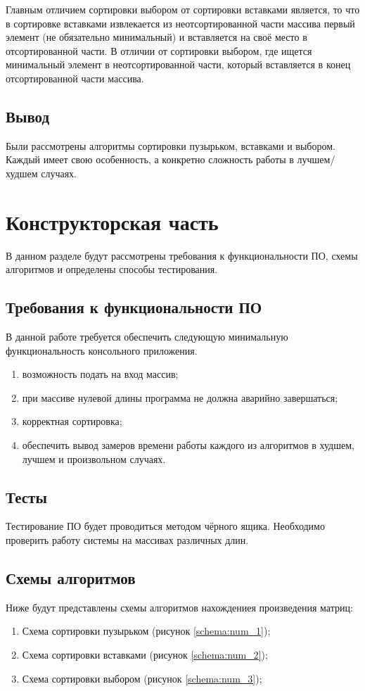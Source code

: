 \documentclass[utf8x, 12pt]{G7-32}
\begin{document}
            Главным отличием сортировки выбором от сортировки вставками является, то что в сортировке вставками 
            извлекается из неотсортированной части массива первый элемент (не обязательно минимальный) и
            вставляется на своё место в отсортированной части.
            В отличии от сортировки выбором, где ищется минимальный элемент 
            в неотсортированной части,  который вставляется в конец отсортированной части массива.

\section{Вывод}
Были рассмотрены алгоритмы сортировки пузырьком, вставками и выбором. Каждый имеет свою особенность, а конкретно сложность работы в лучшем/худшем случаях.




\chapter{Конструкторская часть}
    В данном разделе будут рассмотрены требования к функциональности ПО, схемы алгоритмов
    и определены способы тестирования.

    \section{Требования к функциональности ПО}
        В данной работе требуется обеспечить следующую минимальную функциональность консольного приложения.
            \begin{enumerate}
                \item возможность подать на вход массив;
                \item при массиве нулевой длины программа не должна аварийно завершаться;
		\item корректная сортировка;
	      \item обеспечить вывод замеров времени работы каждого из алгоритмов в худшем, лучшем и произвольном случаях.
            \end{enumerate}
\section{Тесты}
    Тестирование ПО будет проводиться методом чёрного ящика. Необходимо проверить работу системы 
    на массивах различных длин.

    \section{Схемы алгоритмов}
        Ниже будут представлены схемы алгоритмов нахождениея произведения матриц: \begin{enumerate}
            \item Схема сортировки пузырьком (рисунок \ref{schema:num_1});
            \item Схема сортировки вставками (рисунок \ref{schema:num_2});
            \item Схема сортировки выбором (рисунок \ref{schema:num_3});
        \end{enumerate}
\end{document}
